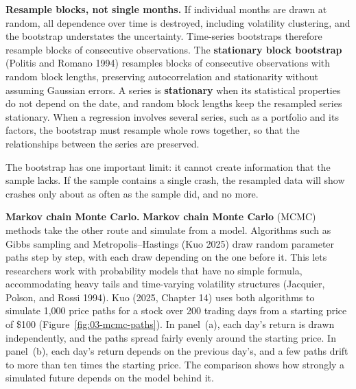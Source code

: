 \textbf{Resample blocks, not single months.} If individual months are drawn at random, all dependence over time is destroyed, including volatility clustering, and the bootstrap understates the uncertainty. Time-series bootstraps therefore resample blocks of consecutive observations. The \textbf{stationary block bootstrap} (Politis and Romano 1994) resamples blocks of consecutive observations with random block lengths, preserving autocorrelation and stationarity without assuming Gaussian errors. A series is \textbf{stationary} when its statistical properties do not depend on the date, and random block lengths keep the resampled series stationary. When a regression involves several series, such as a portfolio and its factors, the bootstrap must resample whole rows together, so that the relationships between the series are preserved.

The bootstrap has one important limit: it cannot create information that the sample lacks. If the sample contains a single crash, the resampled data will show crashes only about as often as the sample did, and no more.

\textbf{Markov chain Monte Carlo.} \textbf{Markov chain Monte Carlo} (MCMC) methods take the other route and simulate from a model. Algorithms such as Gibbs sampling and Metropolis--Hastings (Kuo 2025) draw random parameter paths step by step, with each draw depending on the one before it. This lets researchers work with probability models that have no simple formula, accommodating heavy tails and time-varying volatility structures (Jacquier, Polson, and Rossi 1994). Kuo (2025, Chapter 14) uses both algorithms to simulate 1,000 price paths for a stock over 200 trading days from a starting price of \$100 (Figure~\ref{fig:03-mcmc-paths}). In panel~(a), each day's return is drawn independently, and the paths spread fairly evenly around the starting price. In panel~(b), each day's return depends on the previous day's, and a few paths drift to more than ten times the starting price. The comparison shows how strongly a simulated future depends on the model behind it.

